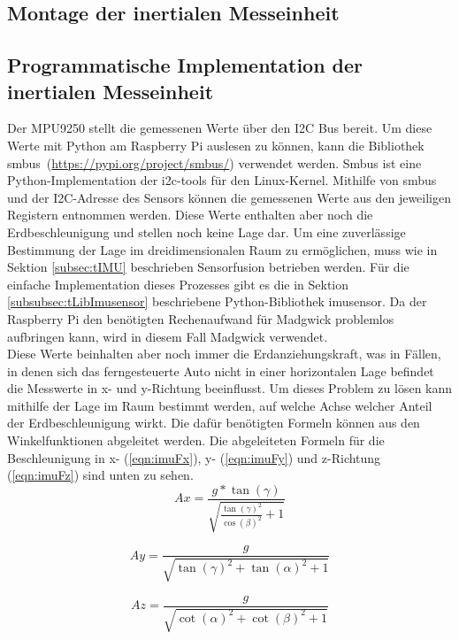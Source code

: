 \subsection{Montage der inertialen Messeinheit}
\label{subsec:IMUmount}

\subsection{Programmatische Implementation der inertialen Messeinheit}
\label{subsec:IMUprogram}
Der MPU9250 stellt die gemessenen Werte über den \ac{I2C} Bus bereit. Um diese Werte mit Python am Raspberry Pi auslesen zu können, kann die Bibliothek \glqq smbus\grqq \ (\url{https://pypi.org/project/smbus/}) verwendet werden. Smbus ist eine Python-Implementation der i2c-tools für den Linux-Kernel. Mithilfe von smbus und der \ac{I2C}-Adresse des Sensors können die gemessenen Werte aus den jeweiligen Registern entnommen werden. Diese Werte enthalten aber noch die Erdbeschleunigung und stellen noch keine Lage dar. Um eine zuverlässige Bestimmung der Lage im dreidimensionalen Raum zu ermöglichen, muss wie in Sektion \ref{subsec:tIMU} beschrieben Sensorfusion betrieben werden. Für die einfache Implementation dieses Prozesses gibt es die in Sektion \ref{subsubsec:tLibImusensor} beschriebene Python-Bibliothek \glqq imusensor\grqq . Da der Raspberry Pi den benötigten Rechenaufwand für Madgwick problemlos aufbringen kann, wird in diesem Fall Madgwick verwendet. \\
Diese Werte beinhalten aber noch immer die Erdanziehungskraft, was in Fällen, in denen sich das ferngesteuerte Auto nicht in einer horizontalen Lage befindet die Messwerte in x- und y-Richtung beeinflusst. Um dieses Problem zu lösen kann mithilfe der Lage im Raum bestimmt werden, auf welche Achse welcher Anteil der Erdbeschleunigung  wirkt. Die dafür benötigten Formeln können aus den Winkelfunktionen abgeleitet werden.
Die abgeleiteten Formeln für die Beschleunigung in x- (\ref{eqn:imuFx}), y- (\ref{eqn:imuFy}) und z-Richtung (\ref{eqn:imuFz}) sind unten zu sehen.
\begin{equation}
Ax=\frac{g*\tan(\gamma)}{\sqrt{\frac{\tan(\gamma)^2}{\cos(\beta)^2}+1}}
\label{eqn:imuFx}
\end{equation}

\begin{equation}
Ay=\frac{g}{\sqrt{\tan(\gamma)^2+\tan(\alpha)^2+1}}
\label{eqn:imuFy}
\end{equation}

\begin{equation}
Az=\frac{g}{\sqrt{\cot(\alpha)^2+\cot(\beta)^2+1}}
\label{eqn:imuFz}
\end{equation}

